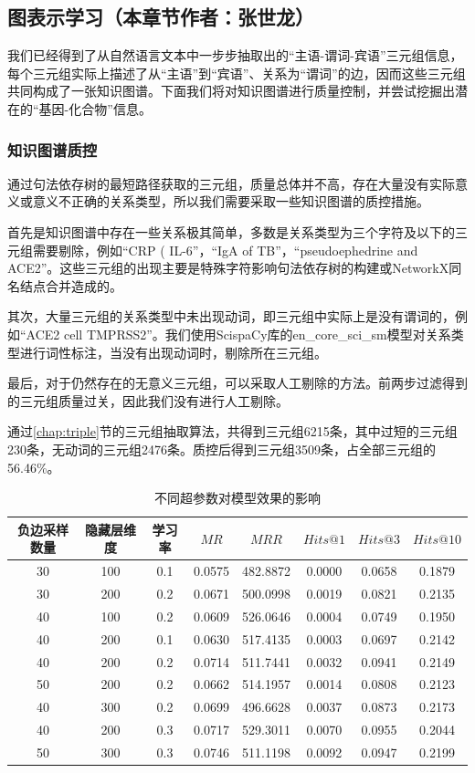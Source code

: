 \documentclass[twocolumn]{article}
\begin{document}
\subsection{图表示学习（本章节作者：张世龙）\label{chap:embedding}}
我们已经得到了从自然语言文本中一步步抽取出的“主语-谓词-宾语”三元组信息，每个三元组实际上描述了从“主语”到“宾语”、关系为“谓词”的边，因而这些三元组共同构成了一张知识图谱。下面我们将对知识图谱进行质量控制，并尝试挖掘出潜在的“基因-化合物”信息。\par

\subsubsection{知识图谱质控\label{chap:kgqc}}
通过句法依存树的最短路径获取的三元组，质量总体并不高，存在大量没有实际意义或意义不正确的关系类型，所以我们需要采取一些知识图谱的质控措施。\par
首先是知识图谱中存在一些关系极其简单，多数是关系类型为三个字符及以下的三元组需要剔除，例如“CRP ( IL-6”，“IgA of TB”，“pseudoephedrine and ACE2”。这些三元组的出现主要是特殊字符影响句法依存树的构建或NetworkX同名结点合并造成的。\par
其次，大量三元组的关系类型中未出现动词，即三元组中实际上是没有谓词的，例如“ACE2 cell TMPRSS2”。我们使用ScispaCy库的en\_core\_sci\_sm模型对关系类型进行词性标注，当没有出现动词时，剔除所在三元组。\par
最后，对于仍然存在的无意义三元组，可以采取人工剔除的方法。前两步过滤得到的三元组质量过关，因此我们没有进行人工剔除。\par
通过\ref{chap:triple}节的三元组抽取算法，共得到三元组6215条，其中过短的三元组230条，无动词的三元组2476条。质控后得到三元组3509条，占全部三元组的56.46\%。\par

\begin{table}[htb]
	\centering
	\caption{不同超参数对模型效果的影响}
	\begin{tabular}{cccccccc}
		\hline
		负边采样数量 & 隐藏层维度 & 学习率 & $MR$ & $MRR$ & $Hits@1$ & $Hits@3$ & $Hits@10$\\
		\hline
		30 & 100 & 0.1 & 0.0575 & 482.8872 & 0.0000 & 0.0658 & 0.1879\\
		30 & 200 & 0.2 & 0.0671 & 500.0998 & 0.0019 & 0.0821 & 0.2135\\
		40 & 100 & 0.2 & 0.0609 & 526.0646 & 0.0004 & 0.0749 & 0.1950\\
		40 & 200 & 0.1 & 0.0630 & 517.4135 & 0.0003 & 0.0697 & 0.2142\\
		40 & 200 & 0.2 & 0.0714 & 511.7441 & 0.0032 & 0.0941 & 0.2149\\
		50 & 200 & 0.2 & 0.0662 & 514.1957 & 0.0014 & 0.0808 & 0.2123\\
		40 & 300 & 0.2 & 0.0699 & 496.6628 & 0.0037 & 0.0873 & 0.2173\\
		40 & 200 & 0.3 & 0.0717 & 529.3011 & 0.0070 & 0.0955 & 0.2044\\
		50 & 300 & 0.3 & 0.0746 & 511.1198 & 0.0092 & 0.0947 & 0.2199\\
		\hline
	\end{tabular}
	\label{tab:hyper}
\end{table}
\end{document}
